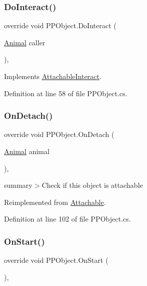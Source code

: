 \subsubsection{\texorpdfstring{Do\+Interact()}{DoInteract()}}
{\footnotesize\ttfamily override void P\+P\+Object.\+Do\+Interact (\begin{DoxyParamCaption}\item[{\mbox{\hyperlink{class_animal}{Animal}}}]{caller }\end{DoxyParamCaption})\hspace{0.3cm}{\ttfamily [protected]}, {\ttfamily [virtual]}}



Implements \mbox{\hyperlink{class_attachable_interact_a9b07a54f1dbb96777c4bd287dfe438e3}{Attachable\+Interact}}.



Definition at line 58 of file P\+P\+Object.\+cs.

\mbox{\label{class_p_p_object_a2cf5c46651860b997fd937c30e29d6b8}} 
\subsubsection{\texorpdfstring{On\+Detach()}{OnDetach()}}
{\footnotesize\ttfamily override void P\+P\+Object.\+On\+Detach (\begin{DoxyParamCaption}\item[{\mbox{\hyperlink{class_animal}{Animal}}}]{animal }\end{DoxyParamCaption})\hspace{0.3cm}{\ttfamily [protected]}, {\ttfamily [virtual]}}



summary$>$Check if this object is attachable



Reimplemented from \mbox{\hyperlink{class_attachable_abe7cf9d7930393610c7c9c4ae14b12d7}{Attachable}}.



Definition at line 102 of file P\+P\+Object.\+cs.

\mbox{\label{class_p_p_object_a365b36598fc60a7d6470147aae73121b}} 
\subsubsection{\texorpdfstring{On\+Start()}{OnStart()}}
{\footnotesize\ttfamily override void P\+P\+Object.\+On\+Start (\begin{DoxyParamCaption}{ }\end{DoxyParamCaption})\hspace{0.3cm}{\ttfamily [protected]}, {\ttfamily [virtual]}}



